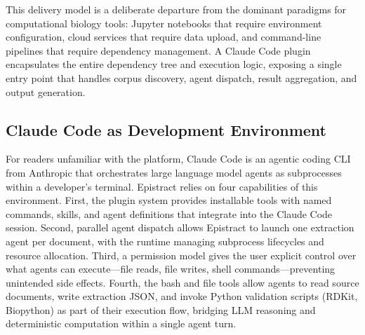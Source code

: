 This delivery model is a deliberate departure from the dominant paradigms for computational biology tools: Jupyter notebooks that require environment configuration, cloud services that require data upload, and command-line pipelines that require dependency management. A Claude Code plugin encapsulates the entire dependency tree and execution logic, exposing a single entry point that handles corpus discovery, agent dispatch, result aggregation, and output generation.

\subsection{Claude Code as Development Environment}

For readers unfamiliar with the platform, Claude Code is an agentic coding CLI from Anthropic that orchestrates large language model agents as subprocesses within a developer's terminal. Epistract relies on four capabilities of this environment. First, the plugin system provides installable tools with named commands, skills, and agent definitions that integrate into the Claude Code session. Second, parallel agent dispatch allows Epistract to launch one extraction agent per document, with the runtime managing subprocess lifecycles and resource allocation. Third, a permission model gives the user explicit control over what agents can execute---file reads, file writes, shell commands---preventing unintended side effects. Fourth, the bash and file tools allow agents to read source documents, write extraction JSON, and invoke Python validation scripts (RDKit, Biopython) as part of their execution flow, bridging LLM reasoning and deterministic computation within a single agent turn.
